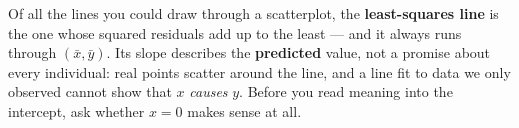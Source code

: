 \documentclass[12pt]{article}
\begin{document}
\vspace{0.14in}

\boxguard[8]
\begin{remindbox}
\small
Of all the lines you could draw through a scatterplot, the \textbf{least-squares line} is the
one whose squared residuals add up to the least --- and it always runs through
$(\bar x, \bar y)$. Its slope describes the \textbf{predicted} value, not a promise about
every individual: real points scatter around the line, and a line fit to data we only
observed cannot show that $x$ \emph{causes} $y$. Before you read meaning into the intercept,
ask whether $x = 0$ makes sense at all.
\end{remindbox}
\end{document}
